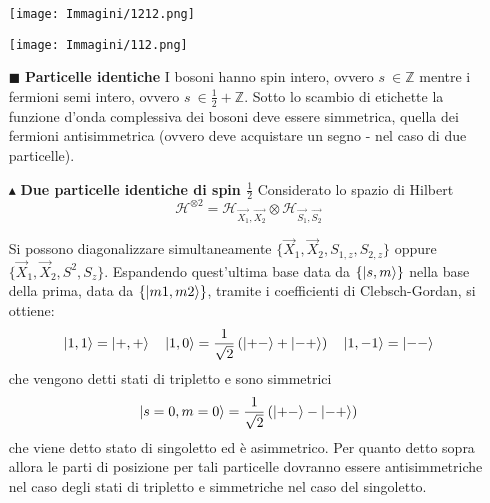 \documentclass{book}
\newcommand{\g}{\textbf}
\newcommand{\e}{\begin{equation}}
\newcommand{\ex}{\end{equation} }
\begin{document}
\begin{multicols}{4}
\begin{itemize}
    \begin{minipage}[t]{1.05\linewidth}
        \centering
        \begin{minipage}[t]{0.42\linewidth} %
            \centering
            \texttt{[image: Immagini/1212.png]}
        \end{minipage}%
        \begin{minipage}[t]{0.62\linewidth} %
            \centering
            \texttt{[image: Immagini/112.png]}
        \end{minipage}
    \end{minipage}
    
\item [$\blacksquare$] \g{Particelle identiche }
I bosoni hanno spin intero, ovvero $s \ \in \mathbb{Z}$ mentre i fermioni semi intero, ovvero $s \ \in \frac{1}{2} + \mathbb{Z}$.
Sotto lo scambio di etichette la funzione d'onda complessiva dei bosoni deve essere simmetrica, quella dei fermioni antisimmetrica (ovvero deve acquistare un segno - nel caso di due particelle). 

\item [$\blacktriangle$] \g{Due particelle identiche di spin $\frac{1}{2}$}
Considerato lo spazio di Hilbert
\e{\mathcal{H}^{\otimes 2} = \mathcal{H}_{\vec{X_{1}}, \vec{X_{2}}} \otimes \mathcal{H}_{\vec{S_{1}}, 
\vec{S_{2}} }}\ex

Si possono diagonalizzare simultaneamente 
$ \{ \vec{X}_1, \vec{X}_2, S_{1,z}, S_{2,z} \}$ oppure $ \{ \vec{X}_1, \vec{X}_2, S^{2}, S_{z} \}$. Espandendo quest'ultima base data da $\{\ket{s,m}\}$ nella base della prima, data da $\{\ket{m1, m2}\}$, tramite i coefficienti di Clebsch-Gordan, si ottiene:
\e{\ket{1,1} = \ket{+,+} \quad \ket{1,0} = \frac{1}{\sqrt{2}}\left(\ket{+-} + \ket{-+}\right) \quad \ket{1,-1} = \ket{--}}\ex
che vengono detti stati di tripletto e sono simmetrici
\e{\ket{s=0,m=0} = \frac{1}{\sqrt{2}}\left(\ket{+-} - \ket{-+}\right)}\ex
che viene detto stato di singoletto ed è asimmetrico. 
Per quanto detto sopra allora le parti di posizione per tali particelle dovranno essere antisimmetriche nel caso degli stati di tripletto e simmetriche nel caso del singoletto. 


\end{itemize}
\end{multicols}
\end{document}
